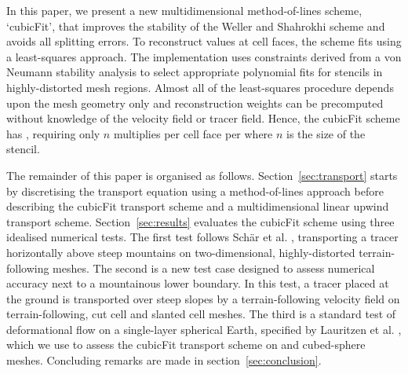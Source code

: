 In this paper, we present a new multidimensional method-of-lines scheme, `cubicFit', that improves the stability of the Weller and Shahrokhi scheme \citep{weller-shahrokhi2014} and avoids all splitting errors.  To reconstruct values at cell faces, the scheme fits  using a least-squares approach.  The implementation uses constraints derived from a von Neumann stability analysis to select appropriate polynomial fits for stencils in highly-distorted mesh regions.  Almost all of the least-squares procedure depends upon the mesh geometry only and reconstruction weights can be precomputed without knowledge of the velocity field or tracer field.
Hence, the cubicFit scheme has , requiring only $n$ multiplies per cell face per  where $n$ is the size of the stencil.  

The remainder of this paper is organised as follows.
Section~\ref{sec:transport} starts by discretising the transport equation using a method-of-lines approach before describing the cubicFit transport scheme and a multidimensional linear upwind transport scheme.
Section~\ref{sec:results} evaluates the cubicFit scheme using three idealised numerical tests.
The first test follows Sch\"ar et al. \citep{schaer2002}, transporting a tracer horizontally above steep mountains on two-dimensional, highly-distorted terrain-following meshes.
The second is a new test case designed to assess numerical accuracy next to a mountainous lower boundary.  In this test, a tracer placed at the ground is transported over steep slopes by a terrain-following velocity field on terrain-following, cut cell and slanted cell meshes.
The third is a standard test of deformational flow on a single-layer spherical Earth, specified by Lauritzen et al. \citep{lauritzen2012}, which we use to assess the cubicFit transport scheme on  and cubed-sphere meshes.
Concluding remarks are made in section~\ref{sec:conclusion}.

